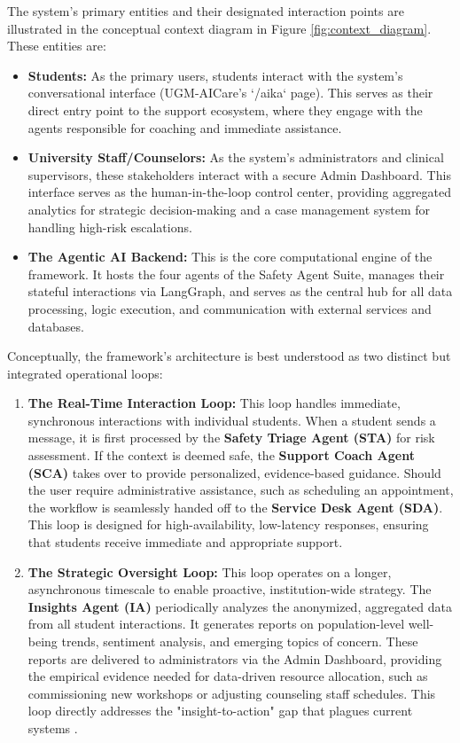 The system's primary entities and their designated interaction points are illustrated in the conceptual context diagram in Figure \ref{fig:context_diagram}. These entities are:
\begin{itemize}
    \item \textbf{Students:} As the primary users, students interact with the system's conversational interface (UGM-AICare's `/aika` page). This serves as their direct entry point to the support ecosystem, where they engage with the agents responsible for coaching and immediate assistance.
    \item \textbf{University Staff/Counselors:} As the system's administrators and clinical supervisors, these stakeholders interact with a secure Admin Dashboard. This interface serves as the human-in-the-loop control center, providing aggregated analytics for strategic decision-making and a case management system for handling high-risk escalations.
    \item \textbf{The Agentic AI Backend:} This is the core computational engine of the framework. It hosts the four agents of the Safety Agent Suite, manages their stateful interactions via LangGraph, and serves as the central hub for all data processing, logic execution, and communication with external services and databases.
\end{itemize}

Conceptually, the framework's architecture is best understood as two distinct but integrated operational loops:

\begin{enumerate}
    \item \textbf{The Real-Time Interaction Loop:} This loop handles immediate, synchronous interactions with individual students. When a student sends a message, it is first processed by the \textbf{Safety Triage Agent (STA)} for risk assessment. If the context is deemed safe, the \textbf{Support Coach Agent (SCA)} takes over to provide personalized, evidence-based guidance. Should the user require administrative assistance, such as scheduling an appointment, the workflow is seamlessly handed off to the \textbf{Service Desk Agent (SDA)}. This loop is designed for high-availability, low-latency responses, ensuring that students receive immediate and appropriate support.
    \item \textbf{The Strategic Oversight Loop:} This loop operates on a longer, asynchronous timescale to enable proactive, institution-wide strategy. The \textbf{Insights Agent (IA)} periodically analyzes the anonymized, aggregated data from all student interactions. It generates reports on population-level well-being trends, sentiment analysis, and emerging topics of concern. These reports are delivered to administrators via the Admin Dashboard, providing the empirical evidence needed for data-driven resource allocation, such as commissioning new workshops or adjusting counseling staff schedules. This loop directly addresses the "insight-to-action" gap that plagues current systems \cite{nwoke2025insightautomation, jorno2018actionableinsight}.
\end{enumerate}

